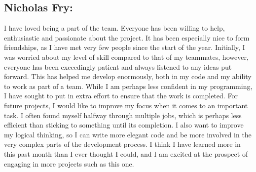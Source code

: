 \documentclass[]{article}
\begin{document}
\subsection*{Nicholas Fry:}

I have loved being a part of the team. Everyone has been willing to help, enthusiastic and passionate about the project. It has been especially nice to form friendships, as I have met very few people since the start of the year.  Initially, I was worried about my level of skill compared to that of my teammates, however, everyone has been exceedingly patient and always listened to any ideas put forward. This has helped me develop enormously, both in my code and my ability to work as part of a team. While I am perhaps less confident in my programming, I have sought to put in extra effort to ensure that the work is completed. For future projects, I would like to improve my focus when it comes to an important task. I often found myself halfway through multiple jobs, which is perhaps less efficient than sticking to something until its completion. I also want to improve my logical thinking, so I can write more elegant code and be more involved in the very complex parts of the development process. I think I have learned more in this past month than I ever thought I could, and I am excited at the prospect of engaging in more  projects such as this one.
\end{document}
